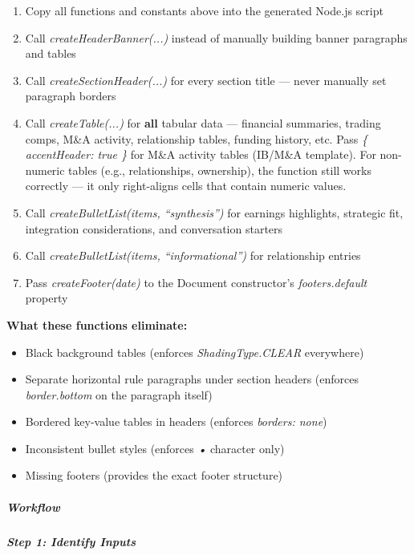 \documentclass[11pt]{article}
\begin{document}
\begin{enumerate}[leftmargin=*,itemsep=2pt,topsep=2pt]
\item {} Copy all functions and constants above into the generated Node.js script
\item {} Call \emph{createHeaderBanner(...)} instead of manually building banner paragraphs and tables
\item {} Call \emph{createSectionHeader(...)} for every section title — never manually set paragraph borders
\item {} Call \emph{createTable(...)} for \textbf{all} tabular data — financial summaries, trading comps, M\&A activity, relationship tables, funding history, etc. Pass \emph{\{ accentHeader: true \}} for M\&A activity tables (IB/M\&A template). For non-numeric tables (e.g., relationships, ownership), the function still works correctly — it only right-aligns cells that contain numeric values.
\item {} Call \emph{createBulletList(items, ``synthesis'')} for earnings highlights, strategic fit, integration considerations, and conversation starters
\item {} Call \emph{createBulletList(items, ``informational'')} for relationship entries
\item {} Pass \emph{createFooter(date)} to the Document constructor's \emph{footers.default} property
\end{enumerate}

\textbf{What these functions eliminate:}

\begin{itemize}[leftmargin=*,itemsep=2pt,topsep=2pt]
\item {} Black background tables (enforces \emph{ShadingType.CLEAR} everywhere)
\item {} Separate horizontal rule paragraphs under section headers (enforces \emph{border.bottom} on the paragraph itself)
\item {} Bordered key-value tables in headers (enforces \emph{borders: none})
\item {} Inconsistent bullet styles (enforces \emph{•} character only)
\item {} Missing footers (provides the exact footer structure)
\end{itemize}

\subparagraph{Workflow}\mbox{}\par

\subparagraph{Step 1: Identify Inputs}\mbox{}\par
\end{document}
